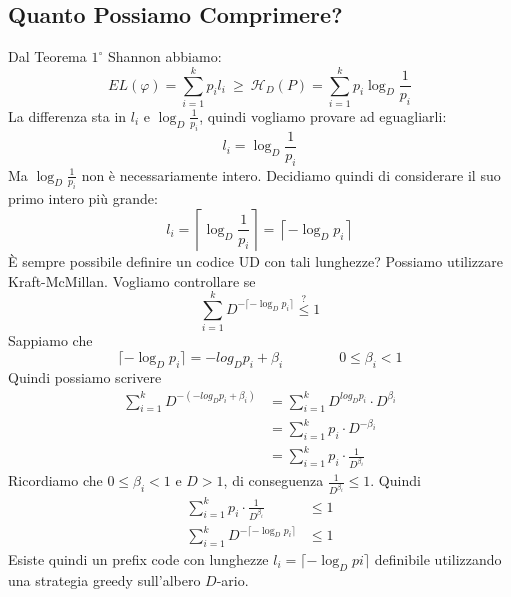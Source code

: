 \subsection{Quanto Possiamo Comprimere?}
Dal Teorema $1^\circ$ Shannon abbiamo:
$$
EL(\varphi) = \sum_{i=1}^k p_il_i ~ \geq ~ \mathcal{H}_D(P) = \sum_{i=1}^k p_i\log_D\frac{1}{p_i}
$$
La differenza sta in $l_i$ e $\log_D\frac{1}{p_i}$, quindi vogliamo provare ad eguagliarli:
$$
    l_i = \log_D\frac{1}{p_i}
$$
Ma $\log_D\frac{1}{p_i}$ non è necessariamente intero. Decidiamo quindi di considerare il suo primo intero più grande:
$$
l_i = \left\lceil\log_D\frac{1}{p_i}\right\rceil = \left\lceil-\log_Dp_i\right\rceil
$$
È sempre possibile definire un codice UD con tali lunghezze? Possiamo utilizzare Kraft-McMillan. Vogliamo controllare se
$$
    \sum_{i=1}^k D^{-\lceil-\log_Dp_i\rceil}
    \stackrel{?}{\leq}
    1
$$
Sappiamo che 
$$
    \lceil-\log_Dp_i\rceil = -log_Dp_i+\beta_i \qquad\qquad 0\leq\beta_i<1
$$
Quindi possiamo scrivere
\begin{align*}
    \sum_{i=1}^k D^{-(-log_Dp_i+\beta_i)} &= \sum_{i=1}^k D^{log_Dp_i}\cdot D^{\beta_i}\\
    &= \sum_{i=1}^k p_i\cdot D^{-\beta_i}\\
    &= \sum_{i=1}^k p_i\cdot \frac{1}{D^{\beta_i}}
\end{align*}
Ricordiamo che $0\leq\beta_i<1$ e $D>1$, di conseguenza $\frac{1}{D^{\beta_i}}\leq 1$. Quindi
\begin{align*}
    \sum_{i=1}^k p_i\cdot \frac{1}{D^{\beta_i}} &\leq 1\\
    \sum_{i=1}^k D^{-\lceil-\log_Dp_i\rceil} &\leq 1
\end{align*}
Esiste quindi un prefix code con lunghezze $l_i=\lceil-\log_Dpi\rceil$ definibile utilizzando una strategia greedy sull'albero $D$-ario.
\begin{center}
\end{center}

